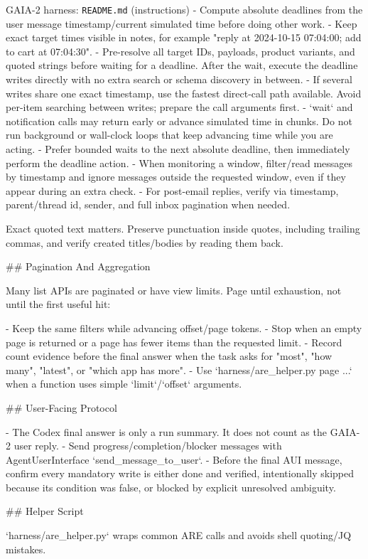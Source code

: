 \documentclass{llmxive}
\begin{document}
\begin{promptbox}{GAIA-2 harness: \texttt{README.md} (instructions)}
- Compute absolute deadlines from the user message timestamp/current simulated time before doing other work.
- Keep exact target times visible in notes, for example "reply at 2024-10-15 07:04:00; add to cart at 07:04:30".
- Pre-resolve all target IDs, payloads, product variants, and quoted strings before waiting for a deadline. After the wait, execute the deadline writes directly with no extra search or schema discovery in between.
- If several writes share one exact timestamp, use the fastest direct-call path available. Avoid per-item searching between writes; prepare the call arguments first.
- `wait` and notification calls may return early or advance simulated time in chunks. Do not run background or wall-clock loops that keep advancing time while you are acting.
- Prefer bounded waits to the next absolute deadline, then immediately perform the deadline action.
- When monitoring a window, filter/read messages by timestamp and ignore messages outside the requested window, even if they appear during an extra check.
- For post-email replies, verify via timestamp, parent/thread id, sender, and full inbox pagination when needed.

Exact quoted text matters. Preserve punctuation inside quotes, including trailing commas, and verify created titles/bodies by reading them back.

## Pagination And Aggregation

Many list APIs are paginated or have view limits. Page until exhaustion, not until the first useful hit:

- Keep the same filters while advancing offset/page tokens.
- Stop when an empty page is returned or a page has fewer items than the requested limit.
- Record count evidence before the final answer when the task asks for "most", "how many", "latest", or "which app has more".
- Use `harness/are_helper.py page ...` when a function uses simple `limit`/`offset` arguments.

## User-Facing Protocol

- The Codex final answer is only a run summary. It does not count as the GAIA-2 user reply.
- Send progress/completion/blocker messages with AgentUserInterface `send_message_to_user`.
- Before the final AUI message, confirm every mandatory write is either done and verified, intentionally skipped because its condition was false, or blocked by explicit unresolved ambiguity.

## Helper Script

`harness/are_helper.py` wraps common ARE calls and avoids shell quoting/JQ mistakes.


\end{promptbox}
\end{document}

